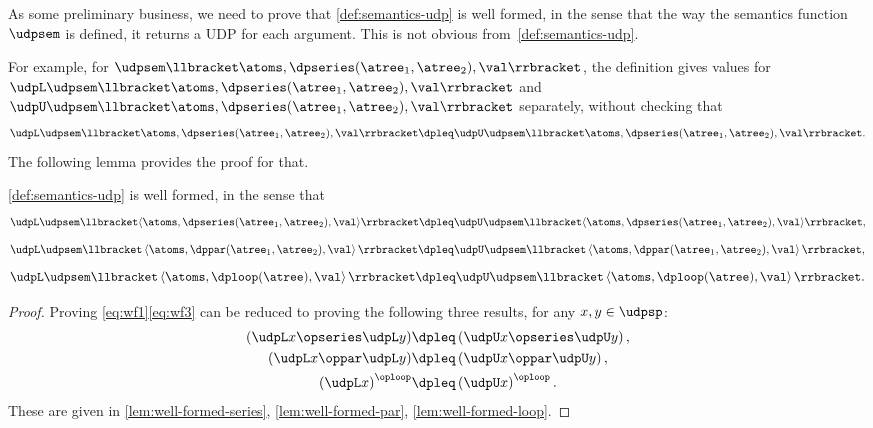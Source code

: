 As some preliminary business, we need to prove that \cref{def:semantics-udp}
is well formed, in the sense that the way the semantics function~$\udpsem$
is defined, it returns a UDP for each argument. This is not obvious
from~\cref{def:semantics-udp}.

For example, for $\udpsem\llbracket\atoms,\dpseries(\atree_{1},\atree_{2}),\val\rrbracket$,
the definition gives values for~$\udpL\udpsem\llbracket\atoms,\dpseries(\atree_{1},\atree_{2}),\val\rrbracket$
and~$\udpU\udpsem\llbracket\atoms,\dpseries(\atree_{1},\atree_{2}),\val\rrbracket$
separately, without checking that
\[
\udpL\udpsem\llbracket\atoms,\dpseries(\atree_{1},\atree_{2}),\val\rrbracket\dpleq\udpU\udpsem\llbracket\atoms,\dpseries(\atree_{1},\atree_{2}),\val\rrbracket.
\]
 The following lemma provides the proof for that.
\begin{lemma}
\label{lem:udpsem-well-formed}\cref{def:semantics-udp} is well
formed, in the sense that {\small{}
\begin{equation}
\udpL\udpsem\llbracket\langle\atoms,\dpseries(\atree_{1},\atree_{2}),\val\rangle\rrbracket\dpleq\udpU\udpsem\llbracket\langle\atoms,\dpseries(\atree_{1},\atree_{2}),\val\rangle\rrbracket,\label{eq:wf1}
\end{equation}
\begin{equation}
\udpL\udpsem\llbracket\left\langle \atoms,\dppar(\atree_{1},\atree_{2}),\val\right\rangle \rrbracket\dpleq\udpU\udpsem\llbracket\left\langle \atoms,\dppar(\atree_{1},\atree_{2}),\val\right\rangle \rrbracket,\label{eq:wf2}
\end{equation}
\begin{equation}
\udpL\udpsem\llbracket\left\langle \atoms,\dploop(\atree),\val\right\rangle \rrbracket\dpleq\udpU\udpsem\llbracket\left\langle \atoms,\dploop(\atree),\val\right\rangle \rrbracket.\label{eq:wf3}
\end{equation}
}{\small \par}
\end{lemma}
\begin{proof}
Proving \cref{eq:wf1}\textemdash \cref{eq:wf3} can be
reduced to proving the following three results, for any $x,y\in\udpsp$:
\begin{align*}
\left(\udpL x\opseries\udpL y\right) & \dpleq\left(\udpU x\opseries\udpU y\right),\\
\left(\udpL x\oppar\udpL y\right) & \dpleq\left(\udpU x\oppar\udpU y\right),\\
\left(\udpL x\right)^{\oploop} & \dpleq\left(\udpU x\right)^{\oploop}.
\end{align*}
These are given in \cref{lem:well-formed-series}, \cref{lem:well-formed-par},
\cref{lem:well-formed-loop}.
\end{proof}
